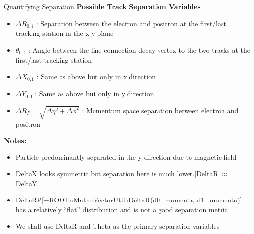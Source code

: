\begin{frame}{Quantifying  Separation}
	\textbf{Possible Track Separation Variables}
	\begin{itemize}
		\item $\Delta R_{0, 1}$ : Separation between the electron and positron at the first/last tracking station in the x-y plane
		\item $\theta_{0, 1}$ : Angle between the line connection decay vertex to the two tracks at the first/last tracking station
		\item $\Delta X_{0,1}$ : Same as above but only in x direction 
		\item $\Delta Y_{0,1}$ : Same as above but only in y direction
		\item $\Delta R_P = \sqrt{\Delta \eta ^2 + \Delta \phi^2}$  : Momentum space separation between electron and positron
	\end{itemize}

	\textbf{\footnotesize Notes:}
	\begin{itemize}
		\scriptsize
		\item Particle predominantly separated in the y-direction due to magnetic field
		\item DeltaX looks symmetric but separation here is much lower.[DeltaR $\approx$ DeltaY]
		\item DeltaRP[=ROOT::Math::VectorUtil::DeltaR(d0\_momenta, d1\_momenta)] has a relatively ``flat'' distribution and is not a good separation metric
		\item We shall use DeltaR and Theta as the primary separation variables
	\end{itemize}
\end{frame}





